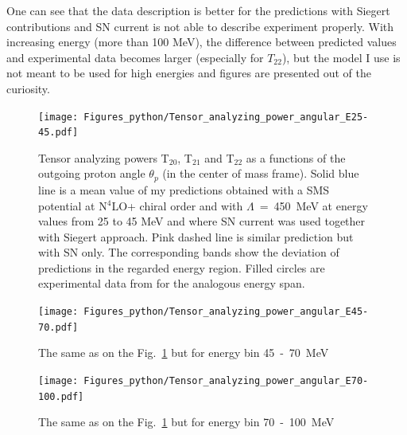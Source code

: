     One can see that the data description is better for the predictions with Siegert contributions 
    and SN current is not able to describe experiment properly. With increasing energy 
    (more than 100 MeV),
    the difference between predicted values and experimental data becomes larger
    (especially for $T_{22}$), but the model I use is not meant to be used for high energies 
    and figures are presented out of the curiosity. 
    




    \begin{figure}[h]
        \begin{center}
        \texttt{[image: Figures\_python/Tensor\_analyzing\_power\_angular\_E25-45.pdf]}
        \end{center}
        \caption{Tensor analyzing powers T$_{20}$, T$_{21}$ and T$_{22}$ as a functions of the
        outgoing proton angle $\theta_p$ (in the center of mass frame).
        Solid blue line is a mean value of my predictions obtained with a
        SMS potential at N$^4$LO+ chiral order and with $\Lambda$~=~450~MeV
        at energy values from 25 to 45 MeV and
        where SN current was used together with Siegert approach. 
        Pink dashed line is similar prediction but with SN only. 
        The corresponding bands show the deviation of predictions in the regarded
        energy region.
        Filled circles are experimental data
        from \cite{rachek2007} for the analogous energy span.}
        \label{tensor_angular_25-45}
    \end{figure}

    \begin{figure}[h]
        \begin{center}
        \texttt{[image: Figures\_python/Tensor\_analyzing\_power\_angular\_E45-70.pdf]}
        \end{center}
        \caption{The same as on the Fig.~\ref*{tensor_angular_25-45} but for energy bin 45~-~70~MeV}
        \label{tensor_angular_45-70}
    \end{figure}

    \begin{figure}[h]
        \begin{center}
        \texttt{[image: Figures\_python/Tensor\_analyzing\_power\_angular\_E70-100.pdf]}
        \end{center}
        \caption{The same as on the Fig.~\ref*{tensor_angular_25-45} but for energy bin 70~-~100~MeV}
        \label{tensor_angular_70-100}
    \end{figure}        

